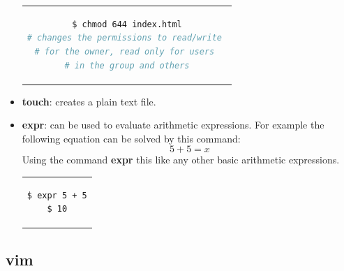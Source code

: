 \documentclass[12pt,a4paper]{article}
\begin{document}
\begin{itemize}
\begin{center}
\begin{tabular}{c}
\begin{lstlisting}[language=bash]
$ chmod 644 index.html
# changes the permissions to read/write 
# for the owner, read only for users 
# in the group and others
\end{lstlisting}
\end{tabular}
\end{center}
\item \textbf{ls}: lists files in the current directory. The command can be modified to list hidden file or to work recursively:

\begin{center}
\begin{tabular}{c}
\begin{lstlisting}[language=bash]
$ ls -all
# lists all files in the directory including
# hidden files
\end{lstlisting}
\end{tabular}
\end{center}
\item \textbf{touch}: creates a plain text file.
\item \textbf{expr}: can be used to evaluate arithmetic expressions. For example the following equation can be solved by this command:
\begin{equation}
5 + 5 = x
\end{equation}
Using the command \textbf{expr} this like any other basic arithmetic expressions.
 
\begin{center}
\begin{tabular}{c}
\begin{lstlisting}[language=bash]
$ expr 5 + 5
$ 10
\end{lstlisting}
\end{tabular}
\end{center}
\end{itemize}
\subsection{vim}
\end{document}
